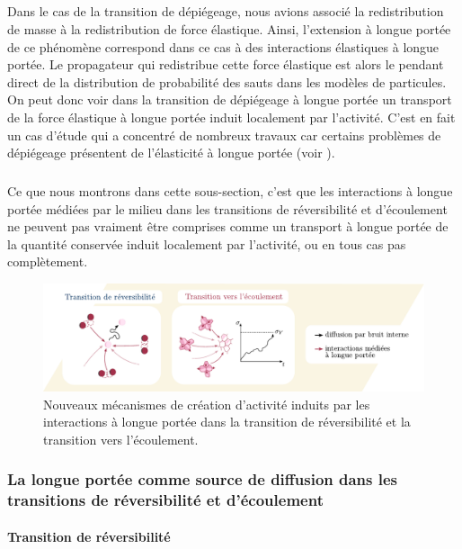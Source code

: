 \subparagraph{}Dans le cas de la transition de dépiégeage, nous avions associé la redistribution de masse à la redistribution de force élastique. Ainsi, l'extension à longue portée de ce phénomène correspond dans ce cas à des interactions élastiques à longue portée. Le propagateur qui redistribue cette force élastique est alors le pendant direct de la distribution de probabilité des sauts dans les modèles de particules. On peut donc voir dans la transition de dépiégeage à longue portée un transport de la force élastique à longue portée induit localement par l'activité. C'est en fait un cas d'étude qui a concentré de nombreux travaux car certains problèmes de dépiégeage présentent de l'élasticité à longue portée (voir ).


\subparagraph{}Ce que nous montrons dans cette sous-section, c'est que les interactions à longue portée médiées par le milieu dans les transitions de réversibilité et d'écoulement ne peuvent pas vraiment être comprises comme un transport à longue portée de la quantité conservée induit localement par l'activité, ou en tous cas pas complètement.

\begin{figure}[h]
	\centering
	\includegraphics[width=\textwidth]{Chapitre1/Figures/Pb/bruit.pdf}
	\caption{Nouveaux mécanismes de création d'activité induits par les interactions à longue portée dans la transition de réversibilité et la transition vers l'écoulement.}
	\label{fig:bruit}
\end{figure}

\subsubsection{La longue portée comme source de diffusion dans les transitions de réversibilité et d'écoulement}

\paragraph{Transition de réversibilité}

